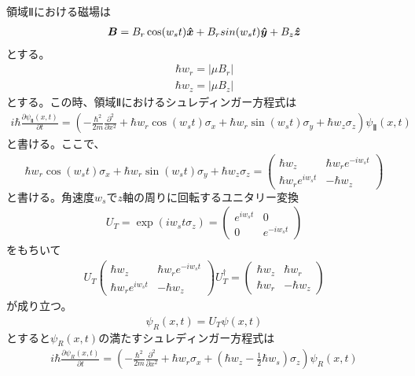 \def\vector#1{\mbox{\boldmath $#1$}}
領域Ⅱにおける磁場は
\begin{align}
\vector{B}=B_{r}\cos(w_{s}t)\vector{\hat{x}}+B_{r}sin(w_{s}t)\vector{\hat{y}}+B_{z}\vector{\hat{z}}
\end{align}
とする。
\begin{align}
{\hbar}w_{r}=|{\mu}B_{r}|
\end{align}
\begin{align}
{\hbar}w_{z}=|{\mu}B_{z}|
\end{align}
とする。この時、領域Ⅱにおけるシュレディンガー方程式は
\begin{align}
i{\hbar}\frac{\partial {\psi}_{Ⅱ}(x,t)}{\partial t}=\left(-\frac{\hbar^2}{2m}\frac{\partial^2}{\partial x^2}+{\hbar}w_{r}\cos(w_{s}t){\sigma}_{x}+{\hbar}w_{r}\sin(w_{s}t){\sigma}_{y}+{\hbar}w_{z}{\sigma}_{z}\right){\psi}_{Ⅱ}(x,t)
\end{align}
と書ける。ここで、
\begin{align}
{\hbar}w_{r}\cos(w_{s}t){\sigma}_{x}+{\hbar}w_{r}\sin(w_{s}t){\sigma}_{y}+{\hbar}w_{z}{\sigma}_{z}=
\begin{pmatrix}
{\hbar}w_{z} &{\hbar}w_{r}e^{-iw_{s}t} \\
{\hbar}w_{r}e^{iw_{s}t} &-{\hbar}w_{z}
\end{pmatrix}
\end{align}
$と書ける。角速度w_{s}でz軸の周りに回転するユニタリー変換$
\begin{align}
U_{T}=\exp(iw_{s}t{\sigma}_{z})=
\begin{pmatrix}
e^{iw_{s}t} &0 \\
0 &e^{-iw_{s}t}
\end{pmatrix}
\end{align}
をもちいて
\begin{align}
U_{T}\begin{pmatrix}
{\hbar}w_{z} &{\hbar}w_{r}e^{-iw_{s}t} \\
{\hbar}w_{r}e^{iw_{s}t} &-{\hbar}w_{z}
\end{pmatrix}U_{T}^{\dagger}=
\begin{pmatrix}
{\hbar}w_{z} &{\hbar}w_{r} \\
{\hbar}w_{r} &-{\hbar}w_{z}
\end{pmatrix}
\end{align}
が成り立つ。
\begin{align}
{\psi}_{R}(x,t)=U_{T}{\psi}(x,t)
\end{align}
$とすると{\psi}_{R}(x,t)の満たすシュレディンガー方程式は$
\begin{align}
i{\hbar}\frac{\partial {\psi}_{R}(x,t)}{\partial t}=\left(-\frac{\hbar^2}{2m}\frac{\partial^2}{\partial x^2}+{\hbar}w_{r}{\sigma}_{x}+({\hbar}w_{z}-\frac{1}{2}{\hbar}w_{s}){\sigma}_{z}\right){\psi}_{R}(x,t)
\end{align}

